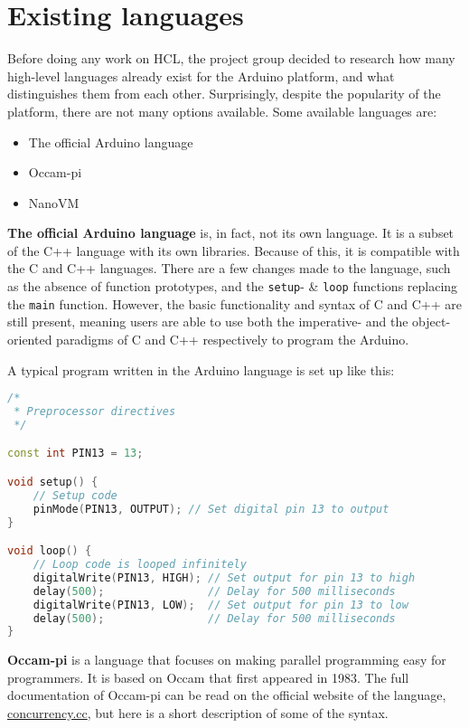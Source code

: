 \section{Existing languages}
Before doing any work on HCL, the project group decided to research how many high-level languages already exist for the Arduino platform, and what distinguishes them from each other.
Surprisingly, despite the popularity of the platform, there are not many options available.
Some available languages are:

\begin{itemize}
	\item The official Arduino language
	\item Occam-pi
	\item NanoVM
\end{itemize}

\textbf{The official Arduino language} is, in fact, not its own language.
It is a subset of the C++ language with its own libraries.
Because of this, it is compatible with the C and C++ languages.
There are a few changes made to the language, such as the absence of function prototypes, and the \texttt{setup}- \& \texttt{loop} functions replacing the \texttt{main} function.
However, the basic functionality and syntax of C and C++ are still present, meaning users are able to use both the imperative- and the object-oriented paradigms of C and C++ respectively to program the Arduino.

A typical program written in the Arduino language is set up like this:

\begin{lstlisting}[language=C++,label=lis:arduinoExample,caption=An example program written in the Arduino language.,firstnumber=1]
/*
 * Preprocessor directives
 */

const int PIN13 = 13;

void setup() {
    // Setup code
    pinMode(PIN13, OUTPUT); // Set digital pin 13 to output
}

void loop() {
    // Loop code is looped infinitely
    digitalWrite(PIN13, HIGH); // Set output for pin 13 to high
    delay(500);                // Delay for 500 milliseconds
    digitalWrite(PIN13, LOW);  // Set output for pin 13 to low
    delay(500);                // Delay for 500 milliseconds
}

\end{lstlisting}

\textbf{Occam-pi} is a language that focuses on making parallel programming easy for programmers.
It is based on Occam that first appeared in 1983.
The full documentation of Occam-pi can be read on the official website of the language, \url{concurrency.cc}, but here is a short description of some of the syntax.

